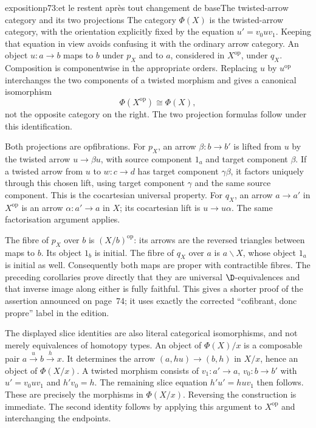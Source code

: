 \begin{dcomment}{exposition}{p73:et le restent après tout changement de base}{The twisted-arrow category and its two projections}
The category $\Phi(X)$ is the twisted-arrow category, with the orientation explicitly fixed by the equation $u'=v_0uv_1$. Keeping that equation in view avoids confusing it with the ordinary arrow category. An object $u:a\to b$ maps to $b$ under $p_X$ and to $a$, considered in $X^{\mathrm{op}}$, under $q_X$. Composition is componentwise in the appropriate orders. Replacing $u$ by $u^{\mathrm{op}}$ interchanges the two components of a twisted morphism and gives a canonical isomorphism
\[
 \Phi(X^{\mathrm{op}})\cong\Phi(X),
\]
not the opposite category on the right. The two projection formulas follow under this identification.

Both projections are opfibrations. For $p_X$, an arrow $\beta:b\to b'$ is lifted from $u$ by the twisted arrow $u\to\beta u$, with source component $1_a$ and target component $\beta$. If a twisted arrow from $u$ to $w:c\to d$ has target component $\gamma\beta$, it factors uniquely through this chosen lift, using target component $\gamma$ and the same source component. This is the cocartesian universal property. For $q_X$, an arrow $a\to a'$ in $X^{\mathrm{op}}$ is an arrow $\alpha:a'\to a$ in $X$; its cocartesian lift is $u\to u\alpha$. The same factorisation argument applies.

The fibre of $p_X$ over $b$ is $(X/b)^{\mathrm{op}}$: its arrows are the reversed triangles between maps to $b$. Its object $1_b$ is initial. The fibre of $q_X$ over $a$ is $a\backslash X$, whose object $1_a$ is initial as well. Consequently both maps are proper with contractible fibres. The preceding corollaries prove directly that they are universal $\D$-equivalences and that inverse image along either is fully faithful. This gives a shorter proof of the assertion announced on page~74; it uses exactly the corrected ``cofibrant, donc propre'' label in the edition.

The displayed slice identities are also literal categorical isomorphisms, and not merely equivalences of homotopy types. An object of $\Phi(X)/x$ is a composable pair $a\xrightarrow{u}b\xrightarrow{h}x$. It determines the arrow $(a,hu)\to(b,h)$ in $X/x$, hence an object of $\Phi(X/x)$. A twisted morphism consists of $v_1:a'\to a$, $v_0:b\to b'$ with $u'=v_0uv_1$ and $h'v_0=h$. The remaining slice equation $h'u'=huv_1$ then follows. These are precisely the morphisms in $\Phi(X/x)$. Reversing the construction is immediate. The second identity follows by applying this argument to $X^{\mathrm{op}}$ and interchanging the endpoints.


\end{dcomment}
